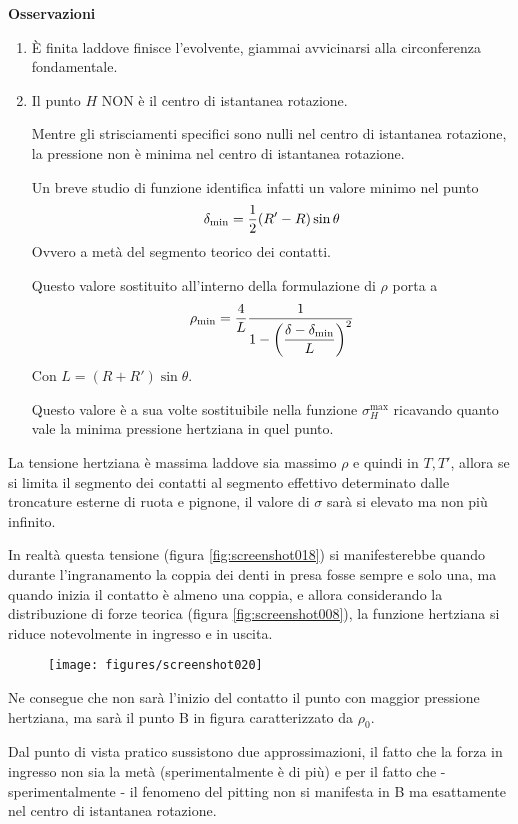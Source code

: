 \documentclass[a4paper, 15pt]{article}
\begin{document}
\begin{adjustwidth}{2in}{}
	\textbf{Osservazioni}
	\begin{enumerate}
		\item È finita laddove finisce l'evolvente, giammai avvicinarsi alla circonferenza fondamentale. 
		\item Il punto $H$ NON è il centro di istantanea rotazione. 
		
		Mentre gli strisciamenti specifici sono nulli nel centro di istantanea rotazione, la pressione non è minima  nel centro di istantanea rotazione. 
		
		Un breve studio di funzione identifica infatti un valore minimo nel punto
		\[\delta_{\min} = {1\over2}(R'-R)\sin\theta\]
		Ovvero a metà del segmento teorico dei contatti. 
		
		Questo valore sostituito all'interno della formulazione di $\rho$ porta a 
		\[\rho_{\min} = {4\over L}\dfrac{1}{1-\left(\dfrac{\delta-\delta_{\min}}{L}\right)^2}\]
		Con $L=(R+R')\sin\theta$. 
		
		Questo valore è a sua volte sostituibile nella funzione $\sigma^{\max}_H$ ricavando quanto vale la minima pressione hertziana in quel punto. 
	\end{enumerate}
	\vspace{0.5cm}
	La tensione hertziana è massima laddove sia massimo $\rho$ e quindi in $T, T'$, allora se si limita il segmento dei contatti al segmento effettivo  determinato dalle troncature esterne di ruota e pignone, il valore di $\sigma$ sarà si elevato ma non più infinito. 
	
	In realtà questa tensione (figura \ref{fig:screenshot018}) si manifesterebbe quando durante l'ingranamento la coppia dei denti in  presa fosse sempre e solo una, ma quando inizia il contatto è almeno una coppia, e allora considerando la distribuzione di forze teorica (figura \ref{fig:screenshot008}), la funzione hertziana si riduce notevolmente in ingresso e in uscita. 
	\begin{figure}[H]
		\centering
		\texttt{[image: figures/screenshot020]}
		\label{fig:screenshot020}
	\end{figure}
	Ne consegue che non sarà l'inizio del contatto il punto con maggior pressione hertziana, ma sarà il punto B in figura caratterizzato da $\rho_{0}$. \newline 
	
	Dal punto di vista pratico sussistono due approssimazioni, il fatto che la forza in ingresso non sia la metà (sperimentalmente è di più) e per il fatto che - sperimentalmente - il fenomeno del pitting non si manifesta in B ma esattamente nel centro di istantanea rotazione. \newline 
	

\end{adjustwidth}
\end{document}
